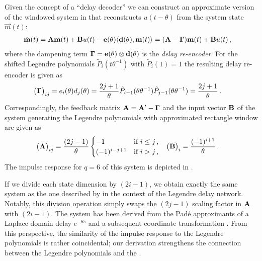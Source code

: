 Given the concept of a \enquote{delay decoder} we can construct an approximate version of the windowed \LTI system in  that reconstructs $u(t - \theta)$ from the system state $\vec m(t)$:
\begin{align}
	\dot{\mathbf{m}}(t)
		&= \mathbf{A} \mathbf{m}(t) + \mathbf{B} u(t) - \mathbf{e}(\theta) \langle \mathbf{d}(\theta), \mathbf{m}(t) \rangle
		 = (\mathbf{A} - \mathbf{\Gamma}) \mathbf{m}(t) + \mathbf{B} u(t)
	\label{eqn:information_erasure_approx} \,,
\end{align}
where the dampening term $\mathbf{\Gamma} = \mathbf{e}(\theta) \otimes \mathbf{d}(\theta)$ is the \emph{delay re-encoder}.
For the shifted Legendre polynomials $\tilde P_i(t \theta^{-1})$ with $\tilde P_i(1) = 1$ the resulting delay re-encoder is given as
\begin{align}
	\big( \mathbf{\Gamma} \big)_{ij} &= e_i(\theta) d_j(\theta) = \frac{2j + 1}{\theta} \tilde P_{i - 1}(\theta \theta^{-1}) \tilde P_{j - 1}(\theta \theta^{-1}) = \frac{2j + 1}{\theta} \,.
	\label{eqn:legendre_delay_reencoder}
\end{align}
Correspondingly, the feedback matrix $\mathbf{A} = \mathbf{A}' - \mathbf{\Gamma}$ and the input vector $\mathbf{B}$ of the \LTI system generating the Legendre polynomials with approximated rectangle window are given as
\begin{align}
	\big( \mathbf{A} \big)_{ij} &= \frac{(2j - 1)}{\theta} \begin{cases}
		-1 & \text{if } i \leq j \,, \\
		(-1)^{i - j + 1} & \text{if } i > j  \,,\\
	\end{cases} &
	\big( \mathbf{B} \big)_i &= \frac{(-1)^{i + 1}}{\theta} \,.
	\label{eqn:ldn_system}
\end{align}
The impulse response for $q = 6$ of this system is depicted in .

If we divide each state dimension by $(2 i - 1)$, we obtain exactly the same system as the one described by \citet[Section 6.3.1, pp.~133-135]{voelker2019} in the context of the Legendre delay network.
Notably, this division operation simply swaps the $(2 j - 1)$ scaling factor in $\mathbf{A}$ with $(2 i - 1)$.
The \LDN system has been derived from the Padé approximants of a Laplace domain delay $e^{-\theta s}$ and a subsequent coordinate transformation \citep{voelker2019}.
From this perspective, the similarity of the impulse response to the Legendre polynomials is rather coincidental; our derivation strengthens the connection between the Legendre polynomials and the \LDN.


